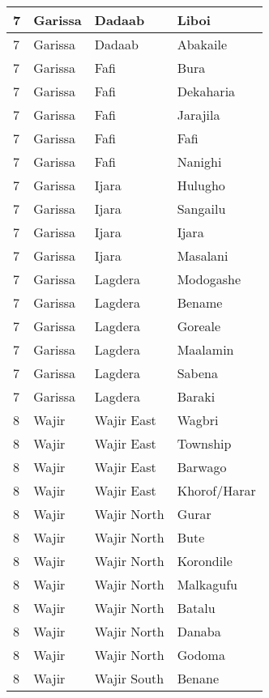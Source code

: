 \begin{table}[!ht]
\begin{tabular}{|l|l|l|l|}
        7 & Garissa & Dadaab & Liboi \\ \hline
        7 & Garissa & Dadaab & Abakaile \\ \hline
        7 & Garissa & Fafi & Bura \\ \hline
        7 & Garissa & Fafi & Dekaharia \\ \hline
        7 & Garissa & Fafi & Jarajila \\ \hline
        7 & Garissa & Fafi & Fafi \\ \hline
        7 & Garissa & Fafi & Nanighi \\ \hline
        7 & Garissa & Ijara & Hulugho \\ \hline
        7 & Garissa & Ijara & Sangailu \\ \hline
        7 & Garissa & Ijara & Ijara \\ \hline
        7 & Garissa & Ijara & Masalani \\ \hline
        7 & Garissa & Lagdera & Modogashe \\ \hline
        7 & Garissa & Lagdera & Bename \\ \hline
        7 & Garissa & Lagdera & Goreale \\ \hline
        7 & Garissa & Lagdera & Maalamin \\ \hline
        7 & Garissa & Lagdera & Sabena \\ \hline
        7 & Garissa & Lagdera & Baraki \\ \hline
        8 & Wajir & Wajir East & Wagbri \\ \hline
        8 & Wajir & Wajir East & Township \\ \hline
        8 & Wajir & Wajir East & Barwago \\ \hline
        8 & Wajir & Wajir East & Khorof/Harar \\ \hline
        8 & Wajir & Wajir North & Gurar \\ \hline
        8 & Wajir & Wajir North & Bute \\ \hline
        8 & Wajir & Wajir North & Korondile \\ \hline
        8 & Wajir & Wajir North & Malkagufu \\ \hline
        8 & Wajir & Wajir North & Batalu \\ \hline
        8 & Wajir & Wajir North & Danaba \\ \hline
        8 & Wajir & Wajir North & Godoma \\ \hline
        8 & Wajir & Wajir South & Benane \\ \hline

\end{tabular}
\end{table}
